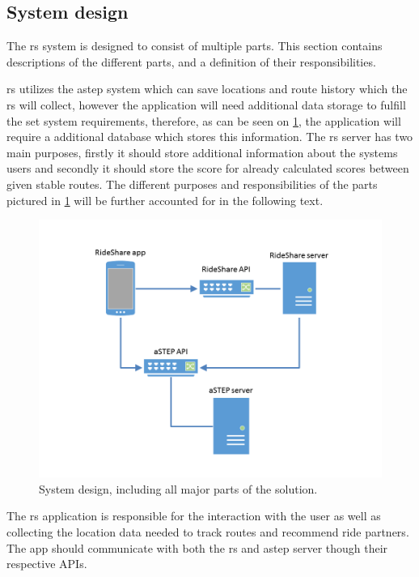 \subsection{System design}
The \gls{rs} system is designed to consist of multiple parts.
This section contains descriptions of the different parts, and a definition of their responsibilities.

\gls{rs} utilizes the \gls{astep} system which can save locations and route history which the \gls{rs} will collect, however the application will need additional data storage to fulfill the set system requirements, therefore, as can be seen on \ref{fig:s2systemdesign}, the application will require a additional database which stores this information.
The \gls{rs} server has two main purposes, firstly it should store additional information about the systems users and secondly it should store the score for already calculated scores between given stable routes.
The different purposes and responsibilities of the parts pictured in \ref{fig:s2systemdesign} will be further accounted for in the following text.

\begin{figure}[!h]
	\centering
	\includegraphics[width=\textwidth]{figures/SystemDesign.png}
	\caption{System design, including all major parts of the solution.}
	\label{fig:s2systemdesign}
\end{figure}

The \gls{rs} application is responsible for the interaction with the user as well as collecting the location data needed to track routes and recommend ride partners.
The app should communicate with both the \gls{rs} and \gls{astep} server though their respective APIs.

